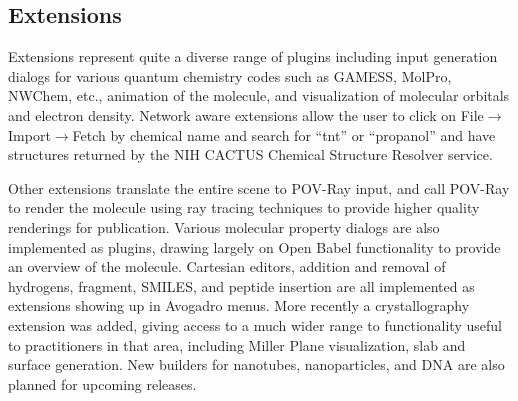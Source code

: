 \documentclass[10pt]{bmc_article}
\newenvironment{bmcformat}{\begin{raggedright}
\baselineskip20pt\sloppy\setboolean{publ}{false}}{\end{raggedright}
\baselineskip20pt\sloppy}
\begin{document}
\begin{bmcformat}
\subsection{Extensions}

Extensions represent quite a diverse range of plugins including
input generation dialogs for various quantum chemistry codes such as GAMESS,
MolPro, NWChem, etc., animation of the molecule, and visualization of
molecular orbitals and electron density. Network aware extensions allow the user
to click on File$\to$Import$\to$Fetch by chemical name and search for ``tnt'' or
``propanol'' and have structures returned by the NIH CACTUS Chemical Structure
Resolver service.

Other extensions translate the entire scene to POV-Ray input, and call POV-Ray
to render the molecule using ray tracing techniques to provide higher quality
renderings for publication. Various molecular property dialogs are also
implemented as plugins, drawing largely on Open Babel functionality to provide
an overview of the molecule. Cartesian editors, addition and removal of
hydrogens, fragment, SMILES, and peptide insertion are all implemented as
extensions showing up in Avogadro menus. More recently a crystallography
extension was added, giving access to a much wider range to functionality
useful to practitioners in that area, including Miller Plane
visualization, slab and surface generation. New builders for
nanotubes, nanoparticles, and DNA are also planned for upcoming releases.


\end{bmcformat}
\end{document}
